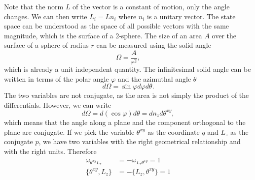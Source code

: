 Note that the norm $L$ of the vector is a constant of motion, only the angle changes. We can then write $L_i = L n_i$ where $n_i$ is a unitary vector. The state space can be understood as the space of all possible vectors with the same magnitude, which is the surface of a 2-sphere. The size of an area $A$ over the surface of a sphere of radius $r$ can be measured using the solid angle
\begin{equation}
	\Omega = \frac{A}{r^2},
\end{equation}
which is already a unit independent quantity. The infinitesimal solid angle can be written in terms of the polar angle $\varphi$ and the azimuthal angle $\theta$
\begin{equation}
	d\Omega = \sin \varphi d\varphi d\theta.
\end{equation}
The two variables are not conjugate, as the area is not simply the product of the differentials. However, we can write
\begin{equation}
	d\Omega = d(\cos \varphi) d\theta = dn_z d\theta^{xy},
\end{equation}
which means that the angle along a plane and the component orthogonal to the plane are conjugate. If we pick the variable $\theta^{xy}$ as the coordinate $q$ and $L_z$ as the conjugate $p$, we have two variables with the right geometrical relationship and with the right units. Therefore
\begin{equation}
	\begin{aligned}
		\omega_{\theta^{xy}L_z} &= - \omega_{L_z\theta^{xy}} = 1 \\
		\{\theta^{xy}, L_z \} &= - \{L_z, \theta^{xy}\} = 1
	\end{aligned}
\end{equation}

